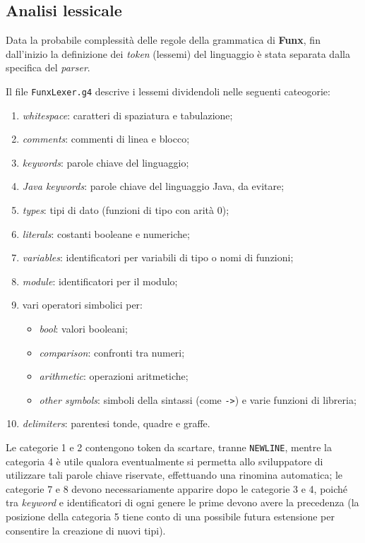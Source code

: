 \subsection{Analisi lessicale}
\label{sec:5-2-lexical-analysis}

Data la probabile complessità delle regole della grammatica di \textbf{Funx}, fin dall'inizio la definizione dei \textit{token} (lessemi)
del linguaggio è stata separata dalla specifica del \textit{parser}.

\noindent Il file \texttt{FunxLexer.g4} descrive i lessemi dividendoli nelle seguenti cateogorie:
\begin{enumerate}
    \item \textit{whitespace}: caratteri di spaziatura e tabulazione;
    \item \textit{comments}: commenti di linea e blocco;
    \item \textit{keywords}: parole chiave del linguaggio;
    \item \textit{Java keywords}: parole chiave del linguaggio Java, da evitare;
    \item \textit{types}: tipi di dato (funzioni di tipo con arità 0);
    \item \textit{literals}: costanti booleane e numeriche;
    \item \textit{variables}: identificatori per variabili di tipo o nomi di funzioni;
    \item \textit{module}: identificatori per il modulo;
    \item vari operatori simbolici per:
          \begin{itemize}
              \item \textit{bool}: valori booleani;
              \item \textit{comparison}: confronti tra numeri;
              \item \textit{arithmetic}: operazioni aritmetiche;
              \item \textit{other symbols}: simboli della sintassi (come \texttt{->}) e varie funzioni di libreria;
          \end{itemize}
    \item \textit{delimiters}: parentesi tonde, quadre e graffe.
\end{enumerate}

\noindent Le categorie 1 e 2 contengono token da scartare, tranne \texttt{NEWLINE}, mentre la categoria 4 è utile
qualora eventualmente si permetta allo sviluppatore di utilizzare tali parole chiave riservate,
effettuando una rinomina automatica; le categorie 7 e 8 devono necessariamente apparire dopo le categorie 3 e 4,
poiché tra \textit{keyword} e identificatori di ogni genere le prime devono avere la precedenza
(la posizione della categoria 5 tiene conto di una possibile futura estensione per consentire la creazione di nuovi tipi).



